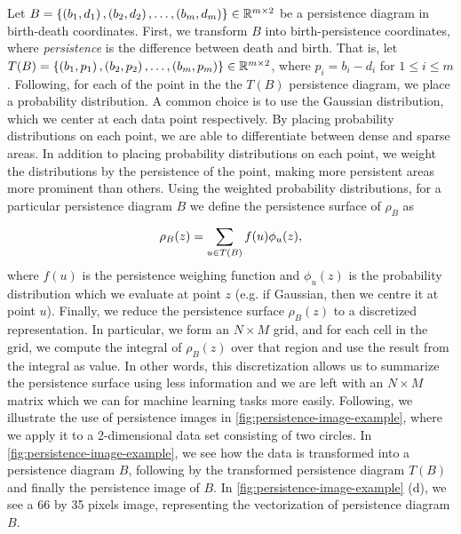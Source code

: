 Let $B = \left\{\left(b_1, d_1\right), \left(b_2, d_2\right), \ldots, \left(b_m, d_m\right)\right\} \in \mathbb{R}^{m \times 2}$ be a persistence diagram in birth-death coordinates. First, we transform $B$ into birth-persistence coordinates, where \textit{persistence} is the difference between death and birth. That is, let $T(B) = \left\{\left(b_1, p_1\right), \left(b_2, p_2\right), \ldots, \left(b_m, p_m\right)\right\} \in \mathbb{R}^{m \times 2}$, where $p_i = b_i - d_i$ for $1 \leq i \leq m$. Following, for each of the point in the the $T(B)$ persistence diagram, we place a probability distribution. A common choice is to use the Gaussian distribution, which we center at each data point respectively. By placing probability distributions on each point, we are able to differentiate between dense and sparse areas. In addition to placing probability distributions on each point, we weight the distributions by the persistence of the point, making more persistent areas more prominent than others. Using the weighted probability distributions, for a particular persistence diagram $B$ we define the persistence surface of $\rho_B$ as
\begin{align}
    \rho_B(z) = \sum\limits_{u \in T(B)}^{} f(u) \phi_u(z),
\end{align}
where $f(u)$ is the persistence weighing function and $\phi_u(z)$ is the probability distribution which we evaluate at point $z$ (e.g. if Gaussian, then we centre it at point $u$). Finally, we reduce the persistence surface $\rho_B(z)$ to a discretized representation. In particular, we form an $N \times M$ grid, and for each cell in the grid, we compute the integral of $\rho_B(z)$ over that region and use the result from the integral as value. In other words, this discretization allows us to summarize the persistence surface using less information and we are left with an $N \times M$ matrix which we can for machine learning tasks more easily. Following, we illustrate the use of persistence images in \cref{fig:persistence-image-example}, where we apply it to a 2-dimensional data set consisting of two circles. In \cref{fig:persistence-image-example}, we see how the data is transformed into a persistence diagram $B$, following by the transformed persistence diagram $T(B)$ and finally the persistence image of $B$. In \cref{fig:persistence-image-example} (d), we see a 66 by 35 pixels image, representing the vectorization of persistence diagram $B$.
